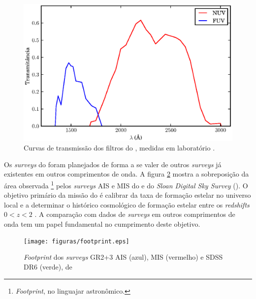 \begin{figure}
	\includegraphics{figuras/galex-filters.eps}
	\caption[Curvas de transmissão dos filtros do \galex.]
	{Curvas de transmissão dos filtros do \galex, medidas em
	laboratório \citep{Morrissey2005}.}
	\label{fig:GalexFilters}
\end{figure}

Os {\em surveys} do \galex foram planejados de forma a se valer de outros {\em
surveys} já existentes em outros comprimentos de onda. A figura
\ref{fig:GalexSDSSOverlap} mostra a sobreposição da área observada
\footnote{{\em Footprint}, no linguajar astronômico.} pelos {\em surveys} AIS e
MIS do \galex e do {\em Sloan Digital Sky Survey} (\SDSS). O objetivo primário da
missão do \galex é calibrar da taxa de formação estelar no universo local e a
determinar o histórico cosmológico de formação estelar entre os {\em redshifts}
$0 < z < 2$ \citep{Martin2005}. A comparação com dados de {\em surveys} em outros
comprimentos de onda tem um papel fundamental no cumprimento deste objetivo.

\begin{figure}
	\texttt{[image: figuras/footprint.eps]}
	\caption[{\em Footprint} dos {\em surveys} \galex AIS, MIS e SDSS]
	{{\em Footprint} dos {\em surveys} \galex GR2+3 AIS (azul), MIS (vermelho) e
	SDSS DR6 (verde), de \citet{Budavari2009}}
	\label{fig:GalexSDSSOverlap}
\end{figure}



